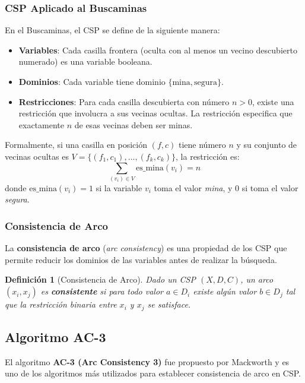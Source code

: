 \documentclass[12pt,a4paper]{article}
\newtheorem{definition}{Definición}[section]
\begin{document}
\subsubsection{CSP Aplicado al Buscaminas}

En el Buscaminas, el CSP se define de la siguiente manera:

\begin{itemize}[itemsep=2pt]
    \item \textbf{Variables}: Cada casilla frontera (oculta con al menos un vecino descubierto numerado) es una variable booleana.
    \item \textbf{Dominios}: Cada variable tiene dominio $\{\text{mina}, \text{segura}\}$.
    \item \textbf{Restricciones}: Para cada casilla descubierta con número $n > 0$, existe una restricción que involucra a sus vecinas ocultas. La restricción especifica que exactamente $n$ de esas vecinas deben ser minas.
\end{itemize}

Formalmente, si una casilla en posición $(f, c)$ tiene número $n$ y su conjunto de vecinas ocultas es $V = \{(f_1, c_1), \ldots, (f_k, c_k)\}$, la restricción es:
\[
\sum_{(v_i) \in V} \text{es\_mina}(v_i) = n
\]
donde $\text{es\_mina}(v_i) = 1$ si la variable $v_i$ toma el valor \textit{mina}, y $0$ si toma el valor \textit{segura}.

\subsubsection{Consistencia de Arco}

La \textbf{consistencia de arco} (\textit{arc consistency}) es una propiedad de los CSP que permite reducir los dominios de las variables antes de realizar la búsqueda.

\begin{definition}[Consistencia de Arco]
Dado un CSP $(X, D, C)$, un arco $(x_i, x_j)$ es \textbf{consistente} si para todo valor $a \in D_i$ existe algún valor $b \in D_j$ tal que la restricción binaria entre $x_i$ y $x_j$ se satisface.
\end{definition}

\subsection{Algoritmo AC-3}

El algoritmo \textbf{AC-3 (Arc Consistency 3)} fue propuesto por Mackworth \cite{mackworth1977consistency} y es uno de los algoritmos más utilizados para establecer consistencia de arco en CSP.
\end{document}
